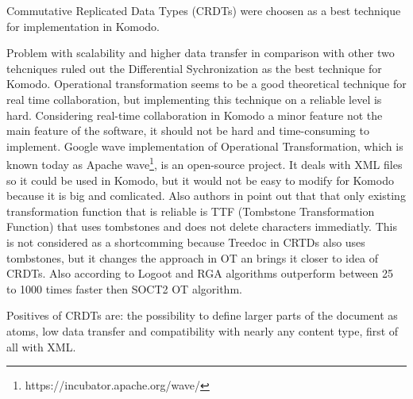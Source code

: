 \documentclass[12pt,oneside]{fithesis2}
\begin{document}
Commutative Replicated Data Types (CRDTs) were choosen as a best technique for implementation in Komodo. 
\par Problem with scalability and higher data transfer in comparison with other two tehcniques ruled out the Differential Sychronization as the best technique for Komodo. Operational transformation seems to be a good theoretical technique for real time collaboration, but implementing this technique on a reliable level is hard. Considering real-time collaboration in Komodo a minor feature not the main feature of the software, it should not be hard and time-consuming to implement. Google wave implementation of Operational Transformation, which is known today as Apache wave\footnote{https://incubator.apache.org/wave/}, is an open-source project. It deals with XML files so it could be used in Komodo, but it would not be easy to modify for Komodo because it is big and comlicated. Also authors in \cite{evaluating} point out that that only existing transformation function that is reliable is TTF (Tombstone Transformation Function)\cite{ttf} that uses tombstones and does not delete characters immediatly. This is not considered as a shortcomming because Treedoc in CRTDs also uses tombstones, but it changes the approach in OT an brings it closer to idea of CRDTs. Also according to \cite{CRDT-real} Logoot and RGA algorithms outperform between 25 to 1000 times faster then SOCT2 OT algorithm.
\par Positives of CRDTs are: the possibility to define larger parts of the document as atoms, low data transfer and compatibility with nearly any content type, first of all with XML. 
\end{document}
